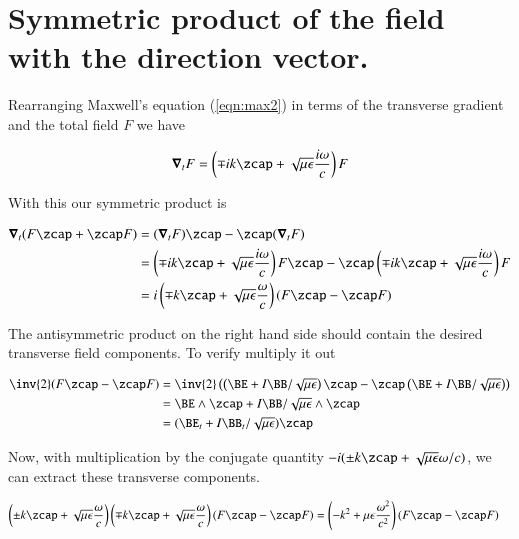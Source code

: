 \section{Symmetric product of the field with the direction vector.}

Rearranging Maxwell's equation (\ref{eqn:max2}) in terms of the transverse gradient and the total field $F$ we have

\begin{align}\label{eqn:blah9}
\spacegrad_t F = \left( \mp i k \zcap + \sqrt{\mu\epsilon}\frac{i\omega}{c}\right) F
\end{align}

With this our symmetric product is

\begin{align*}
\spacegrad_t ( F \zcap + \zcap F) 
&= (\spacegrad_t F) \zcap - \zcap (\spacegrad_t F) \\
&=
\left( \mp i k \zcap + \sqrt{\mu\epsilon}\frac{i\omega}{c}\right) F \zcap
- \zcap \left( \mp i k \zcap + \sqrt{\mu\epsilon}\frac{i\omega}{c}\right) F \\
&=
i \left( \mp k \zcap + \sqrt{\mu\epsilon}\frac{\omega}{c}\right) (F \zcap - \zcap F) \\
\end{align*}

The antisymmetric product on the right hand side should contain the desired transverse field components.  To verify multiply it out

\begin{align*}
\inv{2}(F \zcap - \zcap F)  
&=
\inv{2}\left( \left(\BE + I \BB/\sqrt{\mu\epsilon}\right) \zcap - \zcap \left(\BE + I \BB/\sqrt{\mu\epsilon}\right) \right)  \\
&=
\BE \wedge \zcap + I \BB/\sqrt{\mu\epsilon} \wedge \zcap \\
&=
(\BE_t + I \BB_t/\sqrt{\mu\epsilon}) \zcap \\
\end{align*}

Now, with multiplication by the conjugate quantity $-i(\pm k \zcap + \sqrt{\mu\epsilon}\omega/c)$, we can extract these transverse components.

\begin{align*}
\left( \pm k \zcap + \sqrt{\mu\epsilon}\frac{\omega}{c}\right) \left( \mp k \zcap + \sqrt{\mu\epsilon}\frac{\omega}{c}\right) (F \zcap - \zcap F) &=
\left( -k^2 + {\mu\epsilon}\frac{\omega^2}{c^2}\right) (F \zcap - \zcap F) 
\end{align*}

